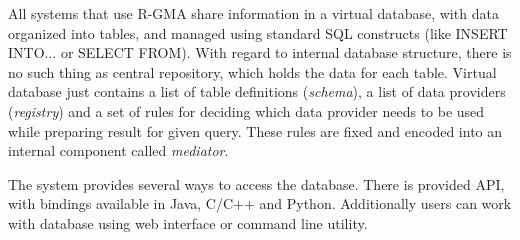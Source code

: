 All systems that use R-GMA share information in a virtual database, with data organized into tables, and managed using standard SQL constructs (like INSERT INTO... or SELECT FROM). With regard to internal database structure, there is no such thing as central repository, which holds the data for each table. Virtual database just contains a list of table definitions (\emph{schema}), a list of data providers (\emph{registry}) and a set of rules for deciding which data provider needs to be used while preparing result for given query. These rules are fixed and encoded into an internal component called \emph{mediator}.

The system provides several ways to access the database. There is provided API, with bindings available in Java, C/C++ and Python. Additionally users can work with database using web interface or command line utility. 
